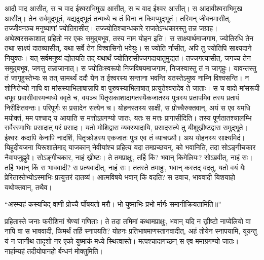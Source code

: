 \adhyAya
{}
\vakya आदौ वाद आसीत्, स च वाद ईश्वराभिमुख आसीत्, स च वाद ईश्वर आसीत्।
\vakya स आदावीश्वराभिमुख आसीत्।
\vakya तेन सर्वमुद्भूतं, यद्यदुद्भूतं तन्मध्ये च तं विना न किमप्युद्भूतं।
\vakya तस्मिन् जीवनमासीत्, तज्जीवनञ्च मनुष्याणां ज्योतिरासीत्।
\vakya तज्ज्योतिश्चान्धकारे राजतेऽन्धकारस्तु तन्न जग्राह।
\vakya अथेश्वरसकाशात् प्रहितो नर एकः समुद्बभूव, तस्य नाम योहन इति।
\vakya स साक्ष्यार्थमाजगाम, ज्योतिरधि तेन तथा साक्ष्यं दातव्यासीत्, यथा सर्वे तेन विश्वासिनो भवेयुः।
\vakya स ज्योति र्नासीत्, अपि तु ज्योतिपि साक्ष्यदाने नियुक्तः।
\vakya यत् सर्वमनुष्यं द्योतयति तद् यथार्थं ज्योतिरासीज्जगदायातुमुद्यतं।
\vakya तज्जगत्यासीत्, जगच्च तेन समुद्बभूव, जगत्तु तन्नाजानात्।
\vakya स ज्योतिःस्वरूपो निजविषयमाजगाम, निजस्वास्तु तं न जागृहुः।
\vakya यावन्तस्तु तं जागृहुस्तेभ्यः स तत् सामर्थ्यं ददौ येन त ईश्वरस्य सन्ताना भवन्ति यतस्तेऽमुष्य नाम्नि विश्वसन्ति।
\vakya न शोणितेभ्यो नापि वा मांसस्याभिलाषान्नापि वा पुरुषस्याभिलाषात् प्रत्युतेश्वरादेव ते जाताः।
\vakya स च वादो मांसरूपी बभूव प्रवासीवास्मन्मध्ये ववृते च, वयञ्च पितृसकाशादागतस्यैकजातस्य पुत्रस्य प्रतापमिव तस्य प्रतापं निरीक्षितवन्तः। परिपूर्णः स प्रसादेन सत्येन च।
\vakya योहनस्तस्य साक्षी, स प्रोच्चैरुक्तवान्, अयं स एव यमधि मयोक्तं, मम पश्चाद् य आयाति स मत्तोऽग्रगण्यो जातः, यतः स मत्तः प्रागासीदिति।
\vakya तस्य पूर्णतातश्चालम्भि सर्वैरस्माभिः प्रसादात् परं प्रसादः।
\vakya यतो मोशिद्वारा व्यवस्थादायि, प्रसादसत्ये तु यीशुख्रीष्टद्वारा समुद्भूते।
\vakya ईश्वरः कदापि केनापि नादर्शि, पितृक्रोडस्य एकजातः पुत्र एव तं व्याचख्यौ।
\vakya अथ योहनस्य साक्ष्यमिदं। यिहूदीयजना यिरूशालेमाद् याजकान् नेवीयांश्च प्रहित्य यदा तमप्रच्छयन्, को भवानिति, तदा सोऽङ्गीचकार नैवापजुह्नुवे।
\vakya सोऽङ्गीचकार, नाहं ख्रीष्टः।
\vakya ते तमप्राक्षुः, तर्हि किं? भवान् किमेलियः? सोऽब्रवीत्, नाहं सः। तर्हि भवान् किं स भाववादी? स प्रत्यवादीत्, नाहं सः।
\vakya ततस्ते तमाहुः, भवान् कस्तद् वदतु, यतो वयं यैः प्रेरितास्तेभ्योऽस्माभिः प्रत्युत्तरं दातव्यं। आत्मविषये भवान् किं वदति?
\vakya स उवाच, भाववादी यिशयाहो यथोक्तवान्, तथैव।
\begin{poem}
\startwithline “अस्म्यहं कस्यचिद् वाणी प्रोच्चै र्घोषयतो मरौ।
\pline भो युष्माभिः प्रभो र्मार्गः समानीक्रियतामिति॥”
\end{poem}
\vakya प्रहितास्ते जनाः फरीशिनां श्रेण्यां गणिताः।
\vakya ते तदा तमिमां कथामप्राक्षुः, भवान् यदि न ख्रीष्टो नाप्येलियो वा नापि वा स भाववादी, किमर्थं तर्हि स्नापयति?
\vakya योहनः प्रतिभाषमाणस्तानवादीत्, अहं तोयेन स्नापयामि, यूयन्तु यं न जानीथ तादृशो नर एको युष्माकं मध्ये स्थित्वास्ते।
\vakya मत्पश्चादागच्छन् स एव ममाग्रगण्यो जातः। नार्हाम्यहं तदीयोपानहो र्बन्धनं मोक्तुमिति।
